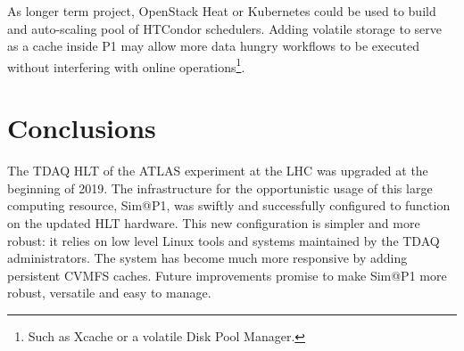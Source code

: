 \documentclass{webofc}
\begin{document}
As longer term project, OpenStack Heat or Kubernetes could be used to build
and auto-scaling pool of HTCondor schedulers. Adding volatile storage to
serve as a cache inside P1 may allow more data hungry workflows to be executed
without interfering with online operations\footnote{Such as Xcache or a volatile
Disk Pool Manager.}.

\section{Conclusions}
The TDAQ HLT of the ATLAS experiment at the LHC was upgraded at the beginning of
2019. The infrastructure for the opportunistic usage of this large computing
resource, Sim@P1, was swiftly and successfully configured to function on the
updated HLT hardware. This new configuration is simpler and more robust: it
relies on low level Linux tools and systems maintained by the
TDAQ administrators. The system has become much more responsive by adding
persistent CVMFS caches. Future improvements promise to make Sim@P1 more robust,
versatile and easy to manage.
\end{document}
